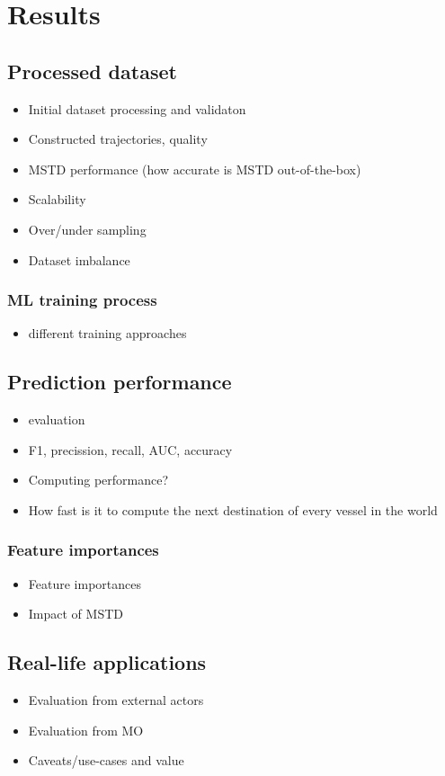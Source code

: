 \chapter{Results}
\label{chap:results}

\section{Processed dataset}

\begin{itemize}
    \item Initial dataset processing and validaton
    \item Constructed trajectories, quality
    \item MSTD performance (how accurate is MSTD out-of-the-box)
    \item Scalability
    \item Over/under sampling
    \item Dataset imbalance
\end{itemize}

\subsection{ML training process}

\begin{itemize}
    \item different training approaches
\end{itemize}

\section{Prediction performance}

\begin{itemize}
    \item evaluation
    \item F1, precission, recall, AUC, accuracy
    \item Computing performance?
    \item How fast is it to compute the next destination of every vessel in the world
\end{itemize}

\subsection{Feature importances}

\begin{itemize}
    \item Feature importances
    \item Impact of MSTD
\end{itemize}

\section{Real-life applications}

\begin{itemize}
    \item Evaluation from external actors
    \item Evaluation from MO
    \item Caveats/use-cases and value
\end{itemize}
